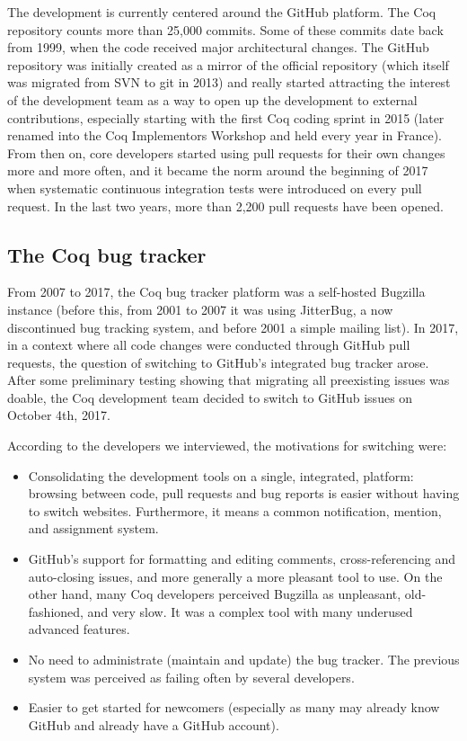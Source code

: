 \documentclass[conference]{IEEEtran}
\begin{document}

The development is currently centered around the GitHub platform. The Coq repository counts more than 25,000 commits. Some of these commits date back from 1999, when the code received major architectural changes. The GitHub repository was initially created as a mirror of the official repository (which itself was migrated from SVN to git in 2013) and really started attracting the interest of the development team as a way to open up the development to external contributions, especially starting with the first Coq coding sprint in 2015 (later renamed into the Coq Implementors Workshop and held every year in France). From then on, core developers started using pull requests for their own changes more and more often, and it became the norm around the beginning of 2017 when systematic continuous integration tests were introduced on every pull request. In the last two years, more than 2,200 pull requests have been opened.

\subsection{The Coq bug tracker}

From 2007 to 2017, the Coq bug tracker platform was a self-hosted Bugzilla instance (before this, from 2001 to 2007 it was using JitterBug, a now discontinued bug tracking system, and before 2001 a simple mailing list). In 2017, in a context where all code changes were conducted through GitHub pull requests, the question of switching to GitHub's integrated bug tracker arose.
After some preliminary testing showing that migrating all preexisting issues was doable, the Coq development team decided to switch to GitHub issues on October 4th, 2017.

According to the developers we interviewed, the motivations for switching were:
\begin{itemize}
\item Consolidating the development tools on a single, integrated, platform: browsing between code, pull requests and bug reports is easier without having to switch websites. Furthermore, it means a common notification, mention, and assignment system.
\item GitHub's support for formatting and editing comments, cross-referencing and auto-closing issues, and more generally a more pleasant tool to use. On the other hand, many Coq developers perceived Bugzilla as unpleasant, old-fashioned, and very slow. It was a complex tool with many underused advanced features.
\item No need to administrate (maintain and update) the bug tracker. The previous system was perceived as failing often by several developers.
\item Easier to get started for newcomers (especially as many may already know GitHub and already have a GitHub account).
\end{itemize}
\end{document}
